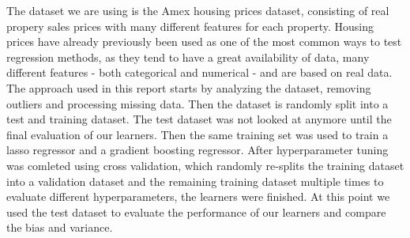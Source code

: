 The dataset we are using is the Amex housing prices dataset, consisting of real propery sales prices with many different features for each property. Housing prices have already previously been used as one of the most common ways to test regression methods, as they tend to have a great availability of data, many different features - both categorical and numerical - and are based on real data.\newline
The approach used in this report starts by analyzing the dataset, removing outliers and processing missing data. Then the dataset is randomly split into a test and training dataset. The test dataset was not looked at anymore until the final evaluation of our learners. Then the same training set was used to train a lasso regressor and a gradient boosting regressor. After hyperparameter tuning was comleted using cross validation, which randomly re-splits the training dataset into a validation dataset and the remaining training dataset multiple times to evaluate different hyperparameters, the learners were finished. At this point we used the test dataset to evaluate the performance of our learners and compare the bias and variance.
